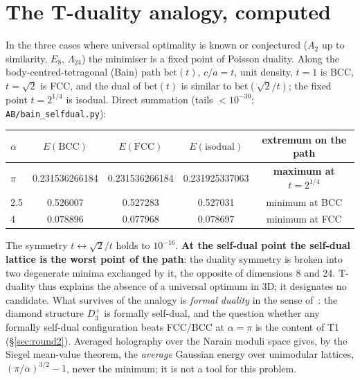 \documentclass[11pt,a4paper]{article}
\begin{document}
\section{The T-duality analogy, computed}\label{sec:bain}
In the three cases where universal optimality is known or conjectured ($A_2$ up to similarity, $E_8$, $\Lambda_{24}$) the
minimiser is a fixed point of Poisson duality. Along the body-centred-tetragonal (Bain) path $\mathrm{bct}(t)$, $c/a=t$, unit
density, $t=1$ is BCC, $t=\sqrt2$ is FCC, and the dual of $\mathrm{bct}(t)$ is similar to $\mathrm{bct}(\sqrt2/t)$; the fixed point
$t=2^{1/4}$ is isodual. Direct summation (tails $<10^{-30}$; \texttt{AB/bain\_selfdual.py}):
\begin{center}\small
\begin{tabular}{lcccc}\toprule
$\alpha$ & $E(\mathrm{BCC})$ & $E(\mathrm{FCC})$ & $E(\text{isodual})$ & extremum on the path\\\midrule
$\pi$ & 0.231536266184 & 0.231536266184 & 0.231925337063 & \textbf{maximum at $t=2^{1/4}$}\\
2.5 & 0.526007 & 0.527283 & 0.527031 & minimum at BCC\\
4 & 0.078896 & 0.077968 & 0.078697 & minimum at FCC\\\bottomrule
\end{tabular}
\end{center}
The symmetry $t\leftrightarrow\sqrt2/t$ holds to $10^{-16}$. \textbf{At the self-dual point the self-dual lattice is the worst
point of the path}: the duality symmetry is broken into two degenerate minima exchanged by it, the opposite of dimensions 8 and
24. T-duality thus explains the absence of a universal optimum in 3D; it designates no candidate. What survives of the analogy is
\emph{formal duality} in the sense of~\cite{CKS09}: the diamond structure $D_3^+$ is formally self-dual, and the question whether
any formally self-dual configuration beats FCC/BCC at $\alpha=\pi$ is the content of T1 (\S\ref{sec:round2}). Averaged holography
over the Narain moduli space gives, by the Siegel mean-value theorem, the \emph{average} Gaussian energy over unimodular lattices,
$(\pi/\alpha)^{3/2}-1$, never the minimum; it is not a tool for this problem.
\end{document}
